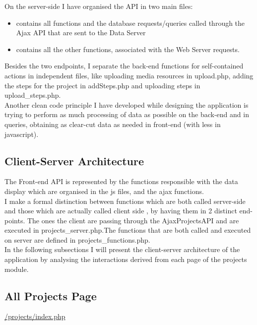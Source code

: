 On the server-side I have organised the API in two main files: 
\begin{itemize}
	\item {} contains all functions and the database requests/queries called through the Ajax API that are sent to the Data Server
	\item {} contains all the other functions, associated with the Web Server requests.
\end{itemize}
 
Besides the two endpoints, I separate the back-end functions for self-contained actions in independent files, like uploading media resources in upload.php, adding the steps for the project in addSteps.php and uploading steps in upload\_steps.php.\\

Another clean code principle I have developed while designing the application is trying to perform as much processing of data as possible on the back-end and in queries, obtaining as clear-cut data as needed in front-end (with less  in javascript). 


\subsection{Client-Server Architecture}

The Front-end API is represented by the functions responsible with the data display which are organised in the js files, and the ajax functions. \\

I make a formal distinction between functions which are both called server-side and those which are actually called  client side , by having them in 2 distinct end-points. The ones  the client are passing through the AjaxProjectsAPI and are executed in projects\_server.php.The functions that are both called and executed on server are defined in projects\_functions.php. \\

In the following subsections I will present the client-server architecture of the application by analysing the interactions derived from each page of the projects module. 

\subsection{All Projects Page}
\url{/projects/index.php}

